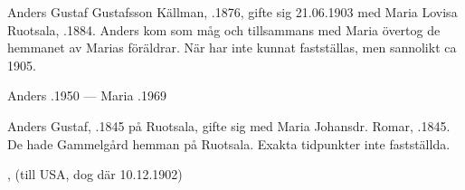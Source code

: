 Anders Gustaf Gustafsson Källman, .1876, gifte sig 21.06.1903 med Maria Lovisa Ruotsala, .1884. Anders kom som måg och tillsammans med Maria övertog de hemmanet av Marias föräldrar. När har inte kunnat fastställas, men sannolikt ca 1905.
\begin{jhchildren}
  \item {}
  \item {}
  \item {}
  \item {}
  \item {}
  \item {}
  \item {}
\end{jhchildren}

Anders .1950  ---  Maria .1969


Anders Gustaf, .1845 på Ruotsala, gifte sig med Maria Johansdr. Romar, .1845. De hade Gammelgård hemman på Ruotsala. Exakta tidpunkter inte fastställda.
\begin{jhchildren}
  \item {}, (till USA, dog där 10.12.1902)
  \item {}
\end{jhchildren}


